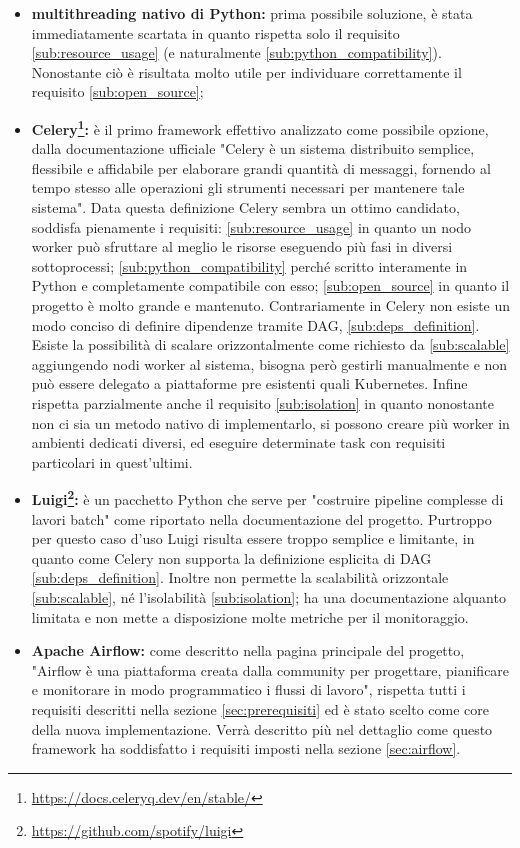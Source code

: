 \begin{itemize}
  \item \textbf{multithreading nativo di Python:} prima possibile soluzione, è stata
    immediatamente scartata in quanto rispetta solo il requisito \ref{sub:resource_usage}
    (e naturalmente \ref{sub:python_compatibility}). Nonostante ciò è risultata
    molto utile per individuare correttamente il requisito \ref{sub:open_source};

  \item \textbf{Celery\footnote{\url{https://docs.celeryq.dev/en/stable/}}:} è
    il primo framework effettivo analizzato come possibile opzione, dalla documentazione
    ufficiale "Celery è un sistema distribuito semplice, flessibile e affidabile
    per elaborare grandi quantità di messaggi, fornendo al tempo stesso alle
    operazioni gli strumenti necessari per mantenere tale sistema". Data questa
    definizione Celery sembra un ottimo candidato, soddisfa pienamente i requisiti:
    \ref{sub:resource_usage} in quanto un nodo worker può sfruttare al meglio le
    risorse eseguendo più fasi in diversi sottoprocessi; \ref{sub:python_compatibility}
    perché scritto interamente in Python e completamente compatibile con esso;
    \ref{sub:open_source} in quanto il progetto è molto grande e mantenuto. Contrariamente
    in Celery non esiste un modo conciso di definire dipendenze tramite DAG,
    \ref{sub:deps_definition}. Esiste la possibilità di scalare orizzontalmente come
    richiesto da \ref{sub:scalable} aggiungendo nodi worker al sistema, bisogna
    però gestirli manualmente e non può essere delegato a piattaforme pre
    esistenti quali Kubernetes. Infine rispetta parzialmente anche il requisito \ref{sub:isolation}
    in quanto nonostante non ci sia un metodo nativo di implementarlo, si
    possono creare più worker in ambienti dedicati diversi, ed eseguire determinate
    task con requisiti particolari in quest'ultimi.

  \item \textbf{Luigi\footnote{\url{https://github.com/spotify/luigi}}:} è un
    pacchetto Python che serve per "costruire pipeline complesse di lavori batch"
    come riportato nella documentazione del progetto. Purtroppo per questo caso d'uso
    Luigi risulta essere troppo semplice e limitante, in quanto come Celery non
    supporta la definizione esplicita di DAG \ref{sub:deps_definition}. Inoltre non
    permette la scalabilità orizzontale \ref{sub:scalable}, né l'isolabilità
    \ref{sub:isolation}; ha una documentazione alquanto limitata e non mette a disposizione
    molte metriche per il monitoraggio.

  \item \textbf{Apache Airflow\cite{airflow}:} come descritto nella pagina
    principale del progetto, "Airflow è una piattaforma creata dalla community
    per progettare, pianificare e monitorare in modo programmatico i flussi di lavoro",
    rispetta tutti i requisiti descritti nella sezione \ref{sec:prerequisiti} ed
    è stato scelto come core della nuova implementazione. Verrà descritto più
    nel dettaglio come questo framework ha soddisfatto i requisiti imposti nella
    sezione \ref{sec:airflow}.
\end{itemize}

